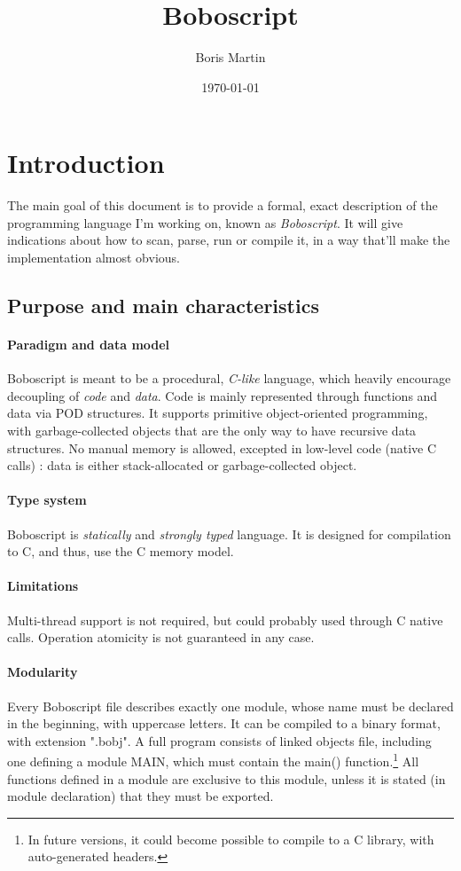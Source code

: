 \documentclass[a4paper, 12pt]{article}
\begin{document}
	\title{Boboscript}
	\author{Boris Martin}
	\date{\today}
	\maketitle

	\tableofcontents
	\newpage

	\section{Introduction}
	The main goal of this document is to provide a formal, exact description of the programming language I'm working on, known as \textit{Boboscript}. It will give indications about how to scan, parse, run or compile it, in a way that'll make the implementation almost obvious.
	
	\subsection{Purpose and main characteristics}
	\paragraph{Paradigm and data model}
	Boboscript is meant to be a procedural, \textit{C-like} language, which heavily encourage decoupling of \textit{code} and \textit{data}. Code is mainly represented through functions and data via POD structures. It supports primitive object-oriented programming, with garbage-collected objects that are the only way to have recursive data structures. No manual memory is allowed, excepted in low-level code (native C calls) : data is either stack-allocated or garbage-collected object.
	\paragraph{Type system}
	Boboscript is \textit{statically} and \textit{strongly typed} language. It is designed for compilation to C, and thus, use the C memory model.
	\paragraph{Limitations}
	Multi-thread support is not required, but could probably used through C native calls. Operation atomicity is not guaranteed in any case.
	\paragraph{Modularity}
	Every Boboscript file describes exactly one module, whose name must be declared in the beginning, with uppercase letters. It can be compiled to a binary format, with extension ".bobj". A full program consists of linked objects file, including one defining a module MAIN, which must contain the main() function.\footnote{In future versions, it could become possible to compile to a C library, with auto-generated headers.}\newline
	All functions defined in a module are exclusive to this module, unless it is stated (in module declaration) that they must be exported.
	
\end{document}
